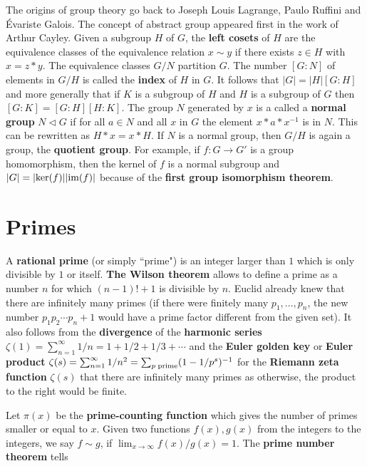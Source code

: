 \documentclass[12pt]{amsart}
\newcounter{example}    \def\example#1{ \item \fontsize{12}{15} \selectfont #1 \fontsize{12}{15} \selectfont }
\begin{document}
The origins of group theory go back to Joseph Louis Lagrange, Paulo Ruffini and \'Evariste Galois. 
The concept of abstract group appeared first in the work of Arthur Cayley. 
Given a subgroup $H$ of $G$, the {\bf left cosets} of $H$ are the equivalence classes of the 
equivalence relation $x \sim y$ if there exists $z \in H$ with $x = z*y$. The equivalence classes
$G/N$ partition $G$. The number $[G:N]$ of elements in $G/H$ is called the {\bf index} of $H$ in $G$. 
It follows that $|G| = |H| [G:H]$ and more generally that if $K$ is a subgroup of $H$ and $H$ is a subgroup of $G$
then $[G:K] = [G:H] [H:K]$. 
The group $N$ generated by $x$ is a called a {\bf normal group} $N \triangleleft G$ if for 
all $a \in N$ and all $x$ in $G$ the element $x * a * x^{-1}$ is in $N$. This can be rewritten
as $H*x = x*H$. If $N$ is a normal group, then $G/H$ is again a group, the {\bf quotient group}.
For example, if $f: G \to G'$ is a group homomorphism, then the kernel of $f$ is a normal subgroup and
$|G| = |{\rm ker}(f)| |{\rm im}(f)|$ because of the {\bf first group isomorphism theorem}.

\section{Primes}

A {\bf rational prime} (or simply ``prime") is an integer larger than $1$ which is only divisible by $1$ or itself.
{\bf The Wilson theorem}
allows to define a prime as a number $n$ for which $(n-1)!+1$ is divisible by $n$. Euclid already knew that there
are infinitely many primes (if there were finitely many $p_1, \dots, p_n$, the new number $p_1 p_2 \cdots p_n+1$
would have a prime factor different from the given set). It also follows from the {\bf divergence} of the 
{\bf harmonic series} $\zeta(1) = \sum_{n=1}^{\infty} 1/n = 1+1/2+1/3 + \cdots$ and the
{\bf Euler golden key} or 
{\bf Euler product} $\zeta(s) = \sum_{n=1}^{\infty} 1/n^2 = \sum_{p \; {\rm prime}} (1-1/p^s)^{-1}$ for 
the {\bf Riemann zeta function} $\zeta(s)$ that there are infinitely many primes as otherwise, the product
to the right would be finite. 

Let $\pi(x)$ be the {\bf prime-counting function} which gives the number of primes
smaller or equal to $x$. Given two functions $f(x),g(x)$ from the integers to the integers,
we say $f \sim g$, if $\lim_{x \to \infty} f(x)/g(x)=1$. The {\bf prime number theorem} tells
\end{document}
